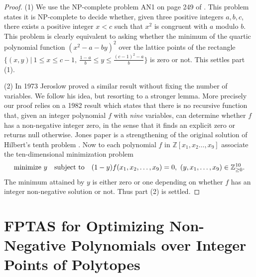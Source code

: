 \documentclass[twoside]{article}
\newcommand{\Z}{\mathbb Z}
\newcommand{\1}{{\bf 1}}
\begin{document}
\begin{proof} (1) We use the NP-complete problem AN1 on page 249 of
\cite{GarJohn79}. This problem states it is NP-complete to decide whether,
given three positive integers $a,b,c$, there exists a positive integer
$x<c$ such that $x^2$ is congruent with $a$ modulo $b$.  This problem is
clearly equivalent to asking whether the minimum of the quartic
polynomial function $(x^2-a-by)^2$ over the lattice points of 
the rectangle $\{(x,y) | \ 1 \leq x  \leq c-1,\ \frac{1-a}{b} \leq y
\leq \frac{(c-1)^2-a}{b} \}$ is zero or not. This settles part (1).

(2) In 1973 Jeroslow \cite{jeroslow} proved a similar result 
without fixing the number of variables. We follow his idea, but
resorting to a stronger lemma. More precisely our proof relies on a
1982 result \cite{jones} which states that there is no recursive
function that, given an integer polynomial $f$ with \emph{nine}
variables, can determine whether $f$ has a non-negative integer
zero, in the sense that it finds an explicit zero or returns
null otherwise.  Jones paper is a strengthening of the original
solution of Hilbert's tenth problem \cite{mati}. Now to each
polynomial $f$ in $\Z [x_1,x_2\dots,x_9]$ associate the
ten-dimensional minimization problem
\begin{equation} 
\hbox{minimize} \ y  \quad  \hbox
{subject to} \quad (1-y)f(x_1,x_2,\dots,x_9)=0, \ (y,x_1,\dots,x_9)
\in \Z_{\geq 0}^{10}. 
\end{equation}
The minimum attained by $y$ is either zero or one depending on whether
$f$ has an integer non-negative solution or not. Thus part (2) is
settled.
\end{proof}

\section{FPTAS for Optimizing Non-Negative Polynomials over
  Integer Points of Polytopes} \label{algo}
\end{document}
